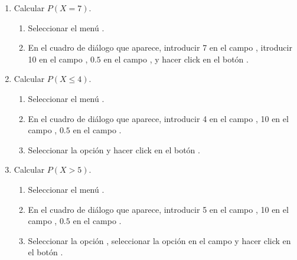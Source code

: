 \begin{enumerate}[leftmargin=*]
\begin{enumerate}
\item Calcular $P(X=7)$.
\begin{indicacion}{
\begin{enumerate}
\item Seleccionar el menú .
\item En el cuadro de diálogo que aparece, introducir 7 en el campo ,
itroducir 10 en el campo , $0.5$ en el campo , y hacer click
en el botón .
\end{enumerate}}
\end{indicacion}

\item Calcular $P(X\leq 4)$.
\begin{indicacion}{
\begin{enumerate}
\item Seleccionar el menú .
\item En el cuadro de diálogo que aparece, introducir 4 en el campo , 10 en el campo
, $0.5$ en el campo .
\item Seleccionar la opción  y hacer click en el botón .
\end{enumerate}}
\end{indicacion}

\item Calcular $P(X>5)$.
\begin{indicacion}{
\begin{enumerate}
\item Seleccionar el menú .
\item En el cuadro de diálogo que aparece, introducir 5 en el campo , 10 en el campo
, $0.5$ en el campo .
\item Seleccionar la opción , seleccionar la opción 
en el campo  y hacer click en el botón .
\end{enumerate}}
\end{indicacion}


\end{enumerate}
\end{enumerate}
